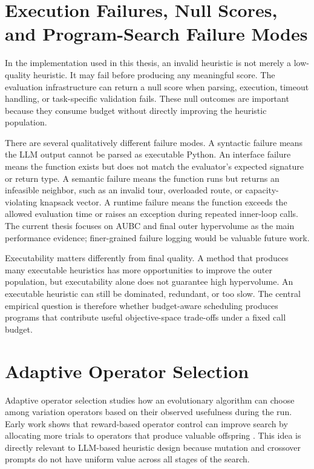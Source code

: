 \documentclass[../main.tex]{subfiles}
\begin{document}
\section{Execution Failures, Null Scores, and Program-Search Failure Modes}

In the implementation used in this thesis, an invalid heuristic is not merely a low-quality heuristic. It may fail before producing any meaningful score. The evaluation infrastructure can return a null score when parsing, execution, timeout handling, or task-specific validation fails. These null outcomes are important because they consume budget without directly improving the heuristic population.

There are several qualitatively different failure modes. A syntactic failure means the LLM output cannot be parsed as executable Python. An interface failure means the function exists but does not match the evaluator's expected signature or return type. A semantic failure means the function runs but returns an infeasible neighbor, such as an invalid tour, overloaded route, or capacity-violating knapsack vector. A runtime failure means the function exceeds the allowed evaluation time or raises an exception during repeated inner-loop calls. The current thesis focuses on AUBC and final outer hypervolume as the main performance evidence; finer-grained failure logging would be valuable future work.

Executability matters differently from final quality. A method that produces many executable heuristics has more opportunities to improve the outer population, but executability alone does not guarantee high hypervolume. An executable heuristic can still be dominated, redundant, or too slow. The central empirical question is therefore whether budget-aware scheduling produces programs that contribute useful objective-space trade-offs under a fixed call budget.

\section{Adaptive Operator Selection}

Adaptive operator selection studies how an evolutionary algorithm can choose among variation operators based on their observed usefulness during the run. Early work shows that reward-based operator control can improve search by allocating more trials to operators that produce valuable offspring \cite{fialho2008adaptive}. This idea is directly relevant to LLM-based heuristic design because mutation and crossover prompts do not have uniform value across all stages of the search.
\end{document}
